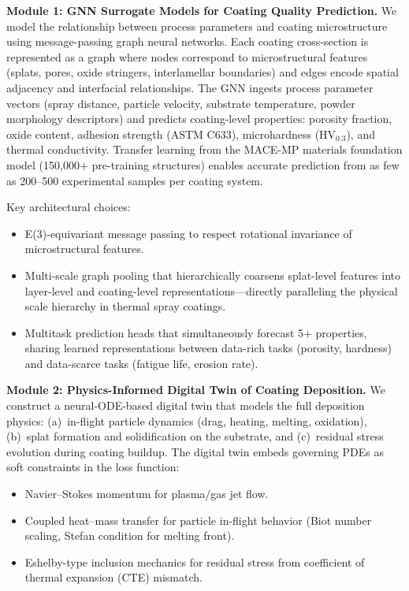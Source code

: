 \documentclass[11pt,letterpaper]{article}
\begin{document}
\textbf{Module 1: GNN Surrogate Models for Coating Quality Prediction.}
We model the relationship between process parameters and coating
microstructure using message-passing graph neural networks. Each coating
cross-section is represented as a graph where nodes correspond to
microstructural features (splats, pores, oxide stringers, interlamellar
boundaries) and edges encode spatial adjacency and interfacial
relationships. The GNN ingests process parameter vectors (spray distance,
particle velocity, substrate temperature, powder morphology
descriptors) and predicts coating-level properties: porosity fraction,
oxide content, adhesion strength (ASTM C633), microhardness (HV$_{0.3}$),
and thermal conductivity. Transfer learning from the MACE-MP
materials foundation model (150,000+ pre-training structures) enables
accurate prediction from as few as 200--500 experimental samples per
coating system.

Key architectural choices:
\begin{itemize}[nosep]
  \item E(3)-equivariant message passing to respect rotational invariance
        of microstructural features.
  \item Multi-scale graph pooling that hierarchically coarsens
        splat-level features into layer-level and coating-level
        representations---directly paralleling the physical scale
        hierarchy in thermal spray coatings.
  \item Multitask prediction heads that simultaneously forecast 5+
        properties, sharing learned representations between data-rich
        tasks (porosity, hardness) and data-scarce tasks (fatigue life,
        erosion rate).
\end{itemize}

\textbf{Module 2: Physics-Informed Digital Twin of Coating Deposition.}
We construct a neural-ODE-based digital twin that models the full
deposition physics: (a)~in-flight particle dynamics (drag, heating,
melting, oxidation), (b)~splat formation and solidification on the
substrate, and (c)~residual stress evolution during coating buildup. The
digital twin embeds governing PDEs as soft constraints in the loss
function:
\begin{itemize}[nosep]
  \item Navier--Stokes momentum for plasma/gas jet flow.
  \item Coupled heat--mass transfer for particle in-flight behavior
        (Biot number scaling, Stefan condition for melting front).
  \item Eshelby-type inclusion mechanics for residual stress from
        coefficient of thermal expansion (CTE) mismatch.
\end{itemize}
\end{document}

